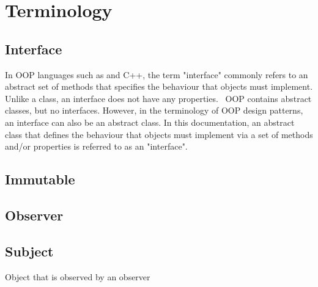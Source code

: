 \section{Terminology}
\subsection*{Interface} \label{sec:interface}
In OOP languages such as \java and C++, the term "interface" commonly refers to an abstract set of methods that specifies the behaviour that objects must implement. Unlike a class, an interface does not have any properties. \matlab\ OOP contains abstract classes, but no interfaces. However, in the terminology of OOP design patterns, an interface can also be an abstract class. In this documentation, an abstract class that defines the behaviour that objects must implement via a set of methods and/or properties is referred to as an "interface".
\subsection*{Immutable}
\subsection*{Observer}
\subsection*{Subject}
Object that is observed by an observer